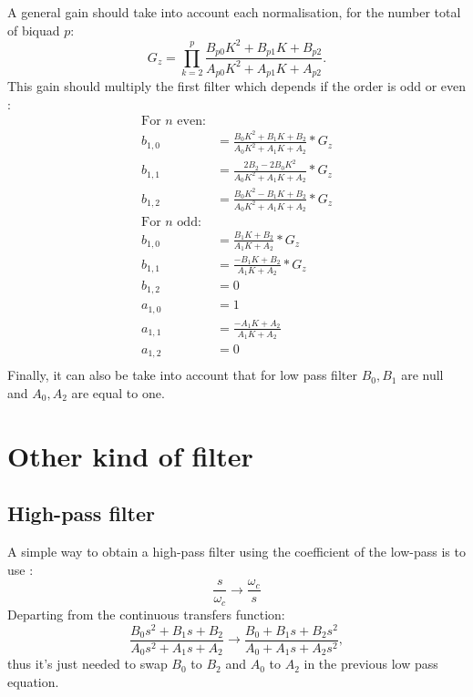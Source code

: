 \documentclass[twoside,twocolumn]{article}
\begin{document}
A general gain should take into account each normalisation, for the number total of biquad $p$:
\begin{equation}
	G_z=\prod_{k=2}^{p}\frac{B_{p0}K^2+B_{p1}K+B_{p2}}{A_{p0}K^2+A_{p1}K+A_{p2}}.
\end{equation} 
This gain should multiply the first filter which depends if the order is odd or even :
\begin{equation}
\begin{split}
\text{For } n \text{ even:}\\
b_{1,0}&=\frac{B_0K^2+B_1K+B_2}{A_0K^2+A_1K+A_2}*G_z\\
b_{1,1}&=\frac{2B_2-2B_0K^2}{A_0K^2+A_1K+A_2}*G_z\\
b_{1,2}&=\frac{B_0K^2-B_1K+B_2}{A_0K^2+A_1K+A_2}*G_z\\
\text{For } n \text{ odd:}\\
b_{1,0}&=\frac{B_1K+B_2}{A_1K+A_2}*G_z\\
b_{1,1}&=\frac{-B_1K+B_2}{A_1K+A_2}*G_z\\
b_{1,2}&=0\\
a_{1,0}&=1\\
a_{1,1}&=\frac{-A_1K+A_2}{A_1K+A_2}\\
a_{1,2}&=0\\
\end{split}	
\end{equation} 
Finally, it can also be take into account that for low pass filter $B_0, B_1$ are null and $A_0 , A_2$ are equal to one.

\section{Other kind of filter}
\subsection{High-pass filter}
A simple way to obtain a high-pass filter using the coefficient of the low-pass is to use :
\begin{equation}
	\frac{s}{\omega_c}\rightarrow\frac{\omega_c}{s}
	\label{eq:lp2hp}
\end{equation}
Departing from the continuous transfers function:
\begin{equation}
\frac{B_0s^2 + B_1s + B_2}{A_0s^2 + A_1s + A_2}\rightarrow \frac{B_0 + B_1s + B_2s^2}{A_0 + A_1s + A_2s^2},
\label{eq:lp2hpTF}
\end{equation}
thus it's just needed to swap $B_0$ to $B_2$ and $A_0$ to $A_2$ in the previous low pass equation.\\
\end{document}
